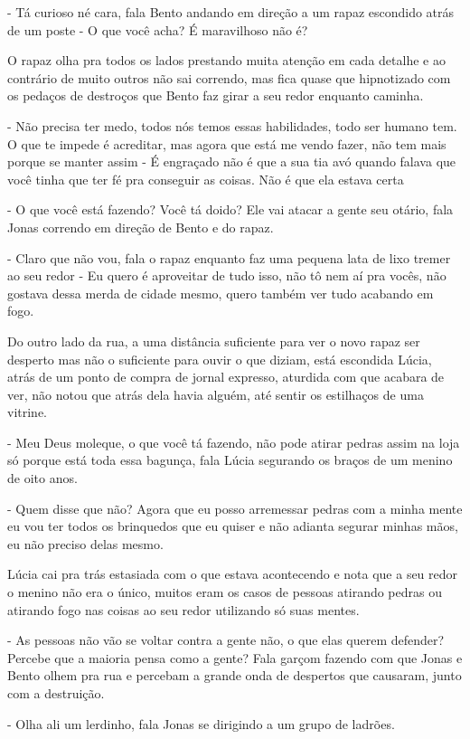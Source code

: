 - Tá curioso né cara, fala Bento andando em direção a um rapaz escondido atrás de um poste - O que você acha? É maravilhoso não é?

O rapaz olha pra todos os lados prestando muita atenção em cada detalhe e ao contrário de muito outros não sai correndo, mas fica quase que hipnotizado com os pedaços de destroços que Bento faz girar a seu redor enquanto caminha.

- Não precisa ter medo, todos nós temos essas habilidades, todo ser humano tem. O que te impede é acreditar, mas agora que está me vendo fazer, não tem mais porque se manter assim - É engraçado não é que a sua tia avó quando falava que você tinha que ter fé pra conseguir as coisas. Não é que ela estava certa

- O que você está fazendo? Você tá doido? Ele vai atacar a gente seu otário, fala Jonas correndo em direção de Bento e do rapaz.

- Claro que não vou, fala o rapaz enquanto faz uma pequena lata de lixo tremer ao seu redor - Eu quero é aproveitar de tudo isso, não tô nem aí pra vocês, não gostava dessa merda de cidade mesmo, quero também ver tudo acabando em fogo.

Do outro lado da rua, a uma distância suficiente para ver o novo rapaz ser desperto mas não o suficiente para ouvir o que diziam, está escondida Lúcia, atrás de um ponto de compra de jornal expresso, aturdida com que acabara de ver, não notou que atrás dela havia alguém, até sentir os estilhaços de uma vitrine.

- Meu Deus moleque, o que você tá fazendo, não pode atirar pedras assim na loja só porque está toda essa bagunça, fala Lúcia segurando os braços de um menino de oito anos.

- Quem disse que não? Agora que eu posso arremessar pedras com a minha mente eu vou ter todos os brinquedos que eu quiser e não adianta segurar minhas mãos, eu não preciso delas mesmo.

Lúcia cai pra trás estasiada com o que estava acontecendo e nota que a seu redor o menino não era o único, muitos eram os casos de pessoas atirando pedras ou atirando fogo nas coisas ao seu redor utilizando só suas mentes.

- As pessoas não vão se voltar contra a gente não, o que elas querem defender? Percebe que a maioria pensa como a gente? Fala garçom fazendo com que Jonas e Bento olhem pra rua e percebam a grande onda de despertos que causaram, junto com a destruição.

- Olha ali um lerdinho, fala Jonas se dirigindo a um grupo de ladrões.

